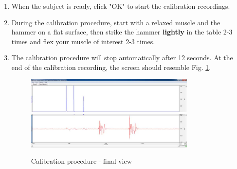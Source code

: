 \documentclass{article}
\begin{document}
\begin{enumerate}
	\item When the subject is ready, click "OK" to start the calibration recordings.
	\item During the calibration procedure, start with a relaxed muscle and the hammer on a flat surface, then strike the hammer \textbf{lightly} in the table 2-3 times and flex your muscle of interest 2-3 times.
	\item The calibration procedure will stop automatically after 12 seconds. At the end of the calibration recording, the screen should resemble Fig. \ref{calibration2}.
		\begin{figure}[h]
		\centering
		\includegraphics[width=0.8\textwidth]{../images/EMG_II_6a.jpg}
		\includegraphics[width=0.8\textwidth]{../images/EMG_II_6b.jpg}	
		\caption{Calibration procedure - final view}
		\label{calibration2}
		\end{figure}


\end{enumerate}
\end{document}
